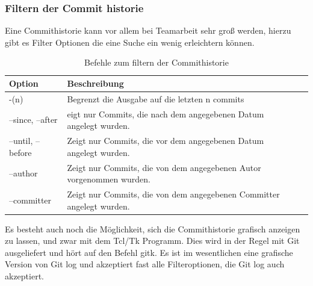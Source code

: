 \documentclass[12pt,a4paper,bibliography=totocnumbered,listof=totocnumbered]{scrartcl}
\begin{document}
\subsubsection{Filtern der Commit historie}
Eine Commithistorie kann vor allem bei Teamarbeit sehr groß werden, hierzu gibt es Filter Optionen die eine Suche ein wenig erleichtern können. 
 \vspace{1em}
\begin{table}[!h]
	\centering
	\begin{tabular}{|l|l|l|}
		\hline
		\textbf{Option} & \textbf{Beschreibung} \\
		\hline
		-(n)& Begrenzt die Ausgabe auf die letzten n commits\\
		\hline
		--since, --after & eigt nur Commits, die nach dem angegebenen Datum angelegt wurden.\\
		\hline
		--until, --before & Zeigt nur Commits, die vor dem angegebenen Datum angelegt wurden.\\
		\hline
		--author & Zeigt nur Commits, die von dem angegebenen Autor vorgenommen wurden.\\
		\hline
		--committer & Zeigt nur Commits, die von dem angegebenen Committer angelegt wurden.\\
		\hline
	\end{tabular}
	\caption{Befehle zum filtern der Commithistorie}
	\label{tab:Befehle}
\end{table}

Es besteht auch noch die Möglichkeit, sich die Commithistorie grafisch anzeigen zu lassen, und zwar mit dem Tcl/Tk Programm.
Dies wird in der Regel mit Git ausgeliefert und hört auf den Befehl gitk. Es ist im wesentlichen eine grafische Version von Git log und akzeptiert fast alle Filteroptionen, die Git log auch akzeptiert.
\end{document}
